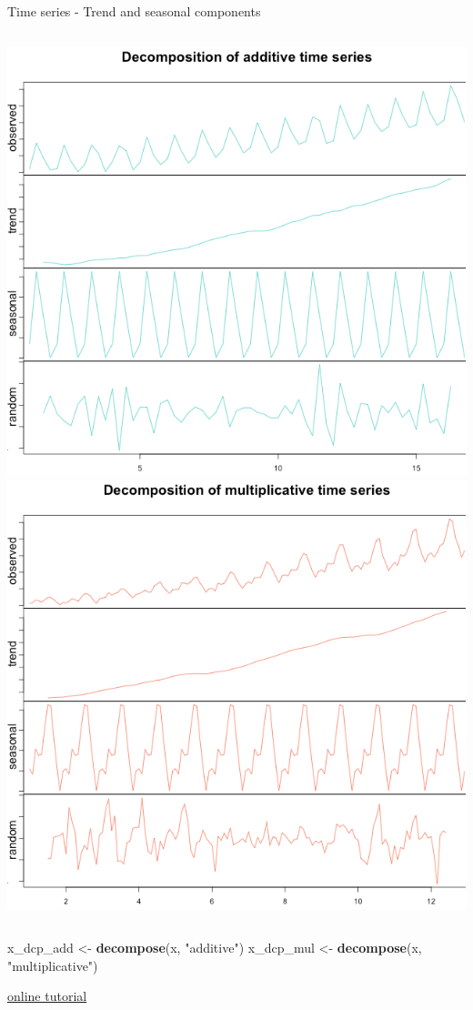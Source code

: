 \documentclass[8pt,ignorenonframetext,]{beamer}
\newenvironment{Shaded}{\begin{snugshade}}{\end{snugshade}}
\newcommand{\KeywordTok}[1]{\textcolor[rgb]{0.13,0.29,0.53}{\textbf{{#1}}}}
\newcommand{\StringTok}[1]{\textcolor[rgb]{0.31,0.60,0.02}{{#1}}}
\newcommand{\NormalTok}[1]{{#1}}
\newcommand{\columnsbegin}{\begin{columns}}
\newcommand{\columnsend}{\end{columns}}
\begin{document}
\begin{frame}[fragile]{Time series - Trend and seasonal components}

\columnsbegin
{} \includegraphics{imgPres/additive-decompose.png}
\includegraphics{imgPres/multiplicative-decompose.png} \columnsend

\begin{Shaded}
\begin{Highlighting}[]
\NormalTok{x_dcp_add <-}\StringTok{ }\KeywordTok{decompose}\NormalTok{(x, }\StringTok{"additive"}\NormalTok{)}
\NormalTok{x_dcp_mul <-}\StringTok{ }\KeywordTok{decompose}\NormalTok{(x, }\StringTok{"multiplicative"}\NormalTok{)}
\end{Highlighting}
\end{Shaded}

\href{https://anomaly.io/seasonal-trend-decomposition-in-r/}{online
tutorial}

\end{frame}
\end{document}
